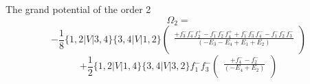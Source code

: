 \documentclass{article}
\begin{document}
The grand potential of the order 2
\[\Omega_{2} = \]
\[-\frac{1}{8}\{1,2|V|3,4\}\{3,4|V|1,2\}\left(\begin{array}{rcl}\frac{+f_{3}^{-}f_{4}^{-}f_{2}^{+}-f_{1}^{-}f_{2}^{-}f_{4}^{+}+f_{1}^{-}f_{3}^{-}f_{4}^{-}-f_{1}^{-}f_{2}^{-}f_{3}^{-}}{(-E_{3}-E_{4}+E_{1}+E_{2})}\\
\end{array}\right)\]\[+\frac{1}{2}\{1,2|V|1,4\}\{3,4|V|3,2\}f_{1}^{-}f_{3}^{-}\left(\begin{array}{rcl}\frac{+f_{4}^{-}-f_{2}^{-}}{(-E_{4}+E_{2})}\\
\end{array}\right)\]
\end{document}
